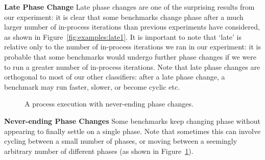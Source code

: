 \documentclass[a4paper,UKenglish]{lipics}
\begin{document}
\textbf{Late Phase Change} \label{sub:phase}
Late phase changes are one of the surprising results from our experiment: it is
clear that some benchmarks change phase after a much larger number of in-process iterations
than previous experiments have considered, as shown in Figure~\ref{fig:examples:late1}.
It is important to note that `late' is relative only to the number of in-process
iterations we ran in our experiment: it is probable that some benchmarks would
undergo further phase changes if we were to run a greater number of in-process
iterations. Note that late phase changes are orthogonal to most of our other
classifiers: after a late phase change, a benchmark may run faster, slower, or
become cyclic etc.


\begin{figure}[tbp]
\caption{A process execution with never-ending phase changes.}
\label{fig:examples:neverending}
\end{figure}

\textbf{Never-ending Phase Changes} \label{sub:long}
Some benchmarks keep changing phase without appearing to finally settle on a
single phase. Note that sometimes this can involve cycling between a small
number of phases, or moving between a seemingly arbitrary number of different
phases (as shown in Figure~\ref{fig:examples:neverending}).
\end{document}
